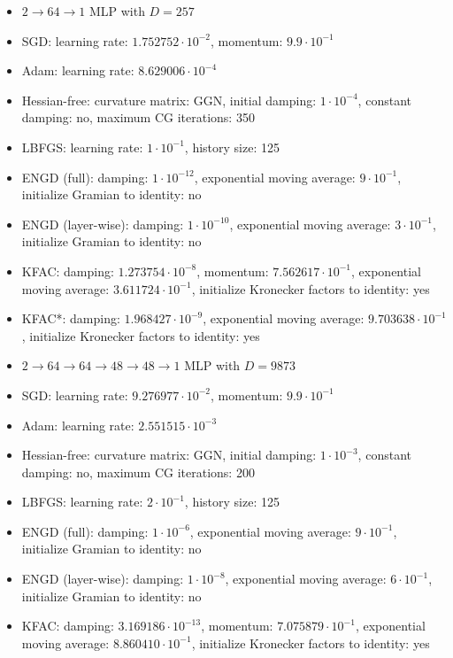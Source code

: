 \documentclass[10pt]{article}
\begin{document}
\begin{itemize}
  \item $2 \rightarrow 64 \rightarrow 1$ MLP with $D=257$
  \item SGD: learning rate: $1.752752 \cdot 10^{-2}$, momentum: $9.9 \cdot 10^{-1}$
  \item Adam: learning rate: $8.629006 \cdot 10^{-4}$
  \item Hessian-free: curvature matrix: GGN, initial damping: $1 \cdot 10^{-4}$, constant damping: no, maximum CG iterations: 350
  \item LBFGS: learning rate: $1 \cdot 10^{-1}$, history size: 125
  \item ENGD (full): damping: $1 \cdot 10^{-12}$, exponential moving average: $9 \cdot 10^{-1}$, initialize Gramian to identity: no
  \item ENGD (layer-wise): damping: $1 \cdot 10^{-10}$, exponential moving average: $3 \cdot 10^{-1}$, initialize Gramian to identity: no
  \item KFAC: damping: $1.273754 \cdot 10^{-8}$, momentum: $7.562617 \cdot 10^{-1}$, exponential moving average: $3.611724 \cdot 10^{-1}$, initialize Kronecker factors to identity: yes
  \item KFAC*: damping: $1.968427 \cdot 10^{-9}$, exponential moving average: $9.703638 \cdot 10^{-1}$, initialize Kronecker factors to identity: yes
  \item $2 \rightarrow 64 \rightarrow 64 \rightarrow 48 \rightarrow 48 \rightarrow 1$ MLP with $D=9873$
  \item SGD: learning rate: $9.276977 \cdot 10^{-2}$, momentum: $9.9 \cdot 10^{-1}$
  \item Adam: learning rate: $2.551515 \cdot 10^{-3}$
  \item Hessian-free: curvature matrix: GGN, initial damping: $1 \cdot 10^{-3}$, constant damping: no, maximum CG iterations: 200
  \item LBFGS: learning rate: $2 \cdot 10^{-1}$, history size: 125
  \item ENGD (full): damping: $1 \cdot 10^{-6}$, exponential moving average: $9 \cdot 10^{-1}$, initialize Gramian to identity: no
  \item ENGD (layer-wise): damping: $1 \cdot 10^{-8}$, exponential moving average: $6 \cdot 10^{-1}$, initialize Gramian to identity: no
  \item KFAC: damping: $3.169186 \cdot 10^{-13}$, momentum: $7.075879 \cdot 10^{-1}$, exponential moving average: $8.860410 \cdot 10^{-1}$, initialize Kronecker factors to identity: yes

\end{itemize}
\end{document}
